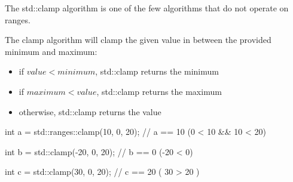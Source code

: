 The std::clamp algorithm is one of the few algorithms that do not operate on ranges.


The clamp algorithm will clamp the given value in between the provided minimum and maximum:

\begin{itemize}
    \item if $value < minimum$, std::clamp returns the minimum
    \item if $maximum < value$, std::clamp returns the maximum
    \item otherwise, std::clamp returns the value
\end{itemize}

\begin{box-note}
\begin{cppcode}
int a = std::ranges::clamp(10, 0, 20);
// a == 10 (0 < 10 && 10 < 20)

int b = std::clamp(-20, 0, 20);
// b == 0 (-20 < 0)

int c = std::clamp(30, 0, 20);
// c == 20 ( 30 > 20 )
\end{cppcode}
\end{box-note}